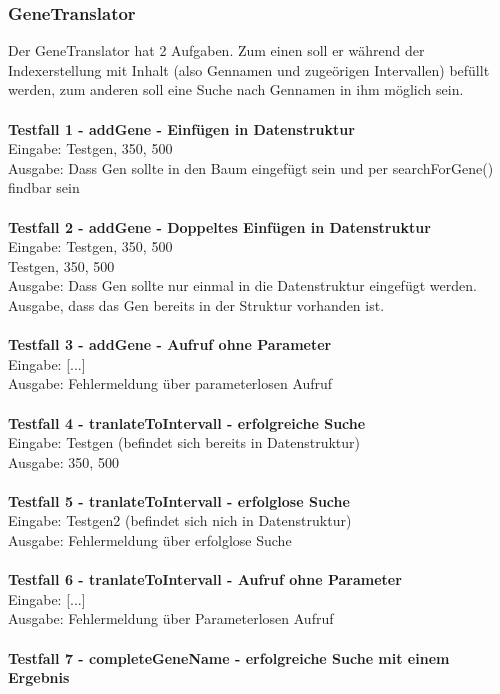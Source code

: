 \documentclass{scrartcl}
\begin{document}
\subsubsection{GeneTranslator}
Der GeneTranslator hat 2 Aufgaben. Zum einen soll er während der Indexerstellung mit Inhalt (also Gennamen und zugeörigen Intervallen) befüllt werden, zum anderen soll eine Suche nach Gennamen in ihm möglich sein.\\
\\
\textbf{Testfall 1 - addGene - Einfügen in Datenstruktur}\\
Eingabe: Testgen, 350, 500\\
Ausgabe: Dass Gen sollte in den Baum eingefügt sein und per searchForGene() findbar sein\\
\\
\textbf{Testfall 2 - addGene - Doppeltes Einfügen in Datenstruktur}\\
Eingabe: Testgen, 350, 500\\
		 Testgen, 350, 500\\
Ausgabe: Dass Gen sollte nur einmal in die Datenstruktur eingefügt werden. Ausgabe, dass das Gen bereits in der Struktur vorhanden ist.\\
\\
\textbf{Testfall 3 - addGene - Aufruf ohne Parameter}\\
Eingabe: [...]\\
Ausgabe: Fehlermeldung über  parameterlosen Aufruf\\
\\
\textbf{Testfall 4 - tranlateToIntervall - erfolgreiche Suche}\\
Eingabe: Testgen (befindet sich bereits in Datenstruktur)\\
Ausgabe: 350, 500\\
\\
\textbf{Testfall 5 - tranlateToIntervall - erfolglose Suche}\\
Eingabe: Testgen2 (befindet sich nich in Datenstruktur)\\
Ausgabe: Fehlermeldung über erfolglose Suche\\
\\
\textbf{Testfall 6 - tranlateToIntervall - Aufruf ohne Parameter}\\
Eingabe: [...]\\
Ausgabe: Fehlermeldung über Parameterlosen Aufruf\\
\\
\textbf{Testfall 7 - completeGeneName - erfolgreiche Suche mit einem Ergebnis}\\
\end{document}
